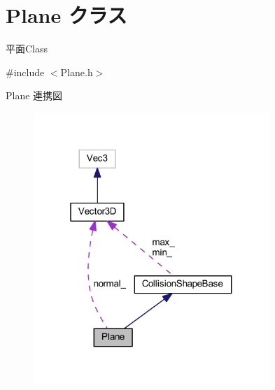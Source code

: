 \hypertarget{class_plane}{}\section{Plane クラス}
\label{class_plane}


平面\+Class  




{\ttfamily \#include $<$Plane.\+h$>$}



Plane 連携図\nopagebreak
\begin{figure}[H]
\begin{center}
\leavevmode
\includegraphics[width=253pt]{class_plane__coll__graph}
\end{center}
\end{figure}
